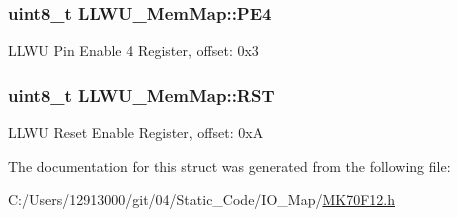 \subsubsection[{P\+E4}]{\setlength{\rightskip}{0pt plus 5cm}uint8\+\_\+t L\+L\+W\+U\+\_\+\+Mem\+Map\+::\+P\+E4}\label{struct_l_l_w_u___mem_map_a61ec3534039e161c5c71ea7f290f23d5}
L\+L\+W\+U Pin Enable 4 Register, offset\+: 0x3 \hypertarget{struct_l_l_w_u___mem_map_a95c7e36f114e8ac7f235ad8ef335f1cf}{}
\subsubsection[{R\+S\+T}]{\setlength{\rightskip}{0pt plus 5cm}uint8\+\_\+t L\+L\+W\+U\+\_\+\+Mem\+Map\+::\+R\+S\+T}\label{struct_l_l_w_u___mem_map_a95c7e36f114e8ac7f235ad8ef335f1cf}
L\+L\+W\+U Reset Enable Register, offset\+: 0x\+A 

The documentation for this struct was generated from the following file\+:\begin{DoxyCompactItemize}
\item 
C\+:/\+Users/12913000/git/04/\+Static\+\_\+\+Code/\+I\+O\+\_\+\+Map/\hyperlink{_m_k70_f12_8h}{M\+K70\+F12.\+h}\end{DoxyCompactItemize}
